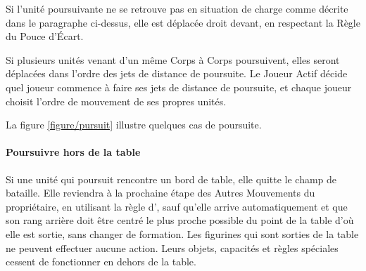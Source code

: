 Si l'unité poursuivante ne se retrouve pas en situation de charge comme décrite dans le paragraphe ci-dessus, elle est déplacée droit devant, en respectant la Règle du Pouce d'Écart. 

Si plusieurs unités venant d'un même Corps à Corps poursuivent, elles seront déplacées dans l'ordre des jets de distance de poursuite. Le Joueur Actif décide quel joueur commence à faire ses jets de distance de poursuite, et chaque joueur choisit l'ordre de mouvement de ses propres unités.

La figure \ref{figure/pursuit} illustre quelques cas de poursuite.

\paragraph{Poursuivre hors de la table}

Si une unité qui poursuit rencontre un bord de table, elle quitte le champ de bataille. Elle reviendra à la prochaine étape des Autres Mouvements du propriétaire, en utilisant la règle d'\ambush{}, sauf qu'elle arrive automatiquement et que son rang arrière doit être centré le plus proche possible du point de la table d'où elle est sortie, sans changer de formation. Les figurines qui sont sorties de la table ne peuvent effectuer aucune action. Leurs objets, capacités et règles spéciales cessent de fonctionner en dehors de la table.

\newcommand{\figPursA}{a)}
\newcommand{\figPursB}{b)}
\newcommand{\figPursC}{c)}
\newcommand{\figPursD}{d)}
\newcommand{\figPursFrontofgreenunitontopofredunit}{Front sur l'unité rouge}
\newcommand{\figPursFrontofgreenunitontopoflightgreenunit}{Front sur l'unité vert clair}
\newcommand{\figPursFrontofgreenunitclearofblueunit}{Front dégagé de l'unité bleue}

